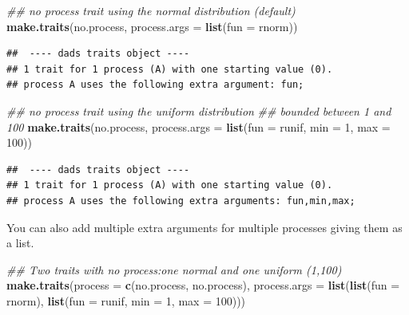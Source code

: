 \documentclass[]{book}
\newenvironment{Shaded}{\begin{snugshade}}{\end{snugshade}}
\newcommand{\CommentTok}[1]{\textcolor[rgb]{0.56,0.35,0.01}{\textit{#1}}}
\newcommand{\DataTypeTok}[1]{\textcolor[rgb]{0.13,0.29,0.53}{#1}}
\newcommand{\DecValTok}[1]{\textcolor[rgb]{0.00,0.00,0.81}{#1}}
\newcommand{\KeywordTok}[1]{\textcolor[rgb]{0.13,0.29,0.53}{\textbf{#1}}}
\newcommand{\NormalTok}[1]{#1}
\begin{document}
\begin{Shaded}
\begin{Highlighting}[]
\CommentTok{## no process trait using the normal distribution (default)}
\KeywordTok{make.traits}\NormalTok{(no.process, }\DataTypeTok{process.args =} \KeywordTok{list}\NormalTok{(}\DataTypeTok{fun =}\NormalTok{ rnorm))}
\end{Highlighting}
\end{Shaded}

\begin{verbatim}
##  ---- dads traits object ---- 
## 1 trait for 1 process (A) with one starting value (0).
## process A uses the following extra argument: fun;
\end{verbatim}

\begin{Shaded}
\begin{Highlighting}[]
\CommentTok{## no process trait using the uniform distribution}
\CommentTok{## bounded between 1 and 100}
\KeywordTok{make.traits}\NormalTok{(no.process, }\DataTypeTok{process.args =} \KeywordTok{list}\NormalTok{(}\DataTypeTok{fun =}\NormalTok{ runif, }\DataTypeTok{min =} \DecValTok{1}\NormalTok{, }\DataTypeTok{max =} \DecValTok{100}\NormalTok{))}
\end{Highlighting}
\end{Shaded}

\begin{verbatim}
##  ---- dads traits object ---- 
## 1 trait for 1 process (A) with one starting value (0).
## process A uses the following extra arguments: fun,min,max;
\end{verbatim}

You can also add multiple extra arguments for multiple processes giving them as a list.

\begin{Shaded}
\begin{Highlighting}[]
\CommentTok{## Two traits with no process:one normal and one uniform (1,100)}
\KeywordTok{make.traits}\NormalTok{(}\DataTypeTok{process      =} \KeywordTok{c}\NormalTok{(no.process, no.process),}
            \DataTypeTok{process.args =} \KeywordTok{list}\NormalTok{(}\KeywordTok{list}\NormalTok{(}\DataTypeTok{fun =}\NormalTok{ rnorm),}
                                \KeywordTok{list}\NormalTok{(}\DataTypeTok{fun =}\NormalTok{ runif, }\DataTypeTok{min =} \DecValTok{1}\NormalTok{, }\DataTypeTok{max =} \DecValTok{100}\NormalTok{)))}
\end{Highlighting}
\end{Shaded}
\end{document}
